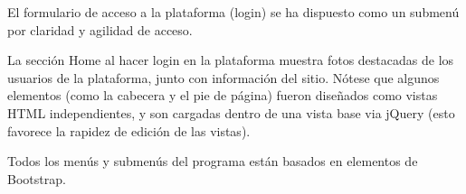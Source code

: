 \documentclass{memoria}
\begin{document}
\newpage

El formulario de acceso a la plataforma (login) se ha dispuesto como un submenú por claridad y agilidad de acceso.

\newpage


La sección Home al hacer login en la plataforma muestra fotos destacadas de los usuarios de la plataforma, junto con información del sitio. Nótese que algunos elementos (como la cabecera y el pie de página) fueron diseñados como vistas HTML independientes, y son cargadas dentro de una vista base via jQuery (esto favorece la rapidez de edición de las vistas).

Todos los menús y submenús del programa están basados en elementos de Bootstrap.
\end{document}
